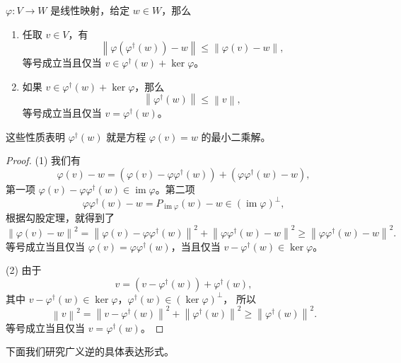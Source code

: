 \documentclass[fontset=none,zihao=-4]{Notes}
\DeclareMathOperator\im{im}
\newcommand{\norm}[1]{\left\lVert#1\right\rVert}
\begin{document}
\begin{theorem}[最小二乘解]
  $\varphi:V\to W$ 是线性映射，给定 $w\in W$，那么
  \begin{enumerate}
    \item 任取 $v\in V$，有
    \[
      \norm{\varphi(\varphi^\dagger(w))-w}\leq\norm{\varphi(v)-w},  
    \]
    等号成立当且仅当 $v\in\varphi^\dagger(w)+\ker\varphi$。
    \item 如果 $v\in\varphi^\dagger(w)+\ker\varphi$，那么
    \[
      \norm{\varphi^\dagger(w)}\leq\norm{v},  
    \]
    等号成立当且仅当 $v=\varphi^\dagger(w)$。
  \end{enumerate}
  这些性质表明 $\varphi^\dagger(w)$ 就是方程 $\varphi(v)=w$ 的最小二乘解。
\end{theorem}
\begin{proof}
  (1) 我们有
  \[
    \varphi(v)-w=(\varphi(v)-\varphi\varphi^\dagger(w))+(\varphi\varphi^\dagger(w)-w),  
  \]
  第一项 $\varphi(v)-\varphi\varphi^\dagger(w)\in\im\varphi$。第二项
  \[
    \varphi\varphi^\dagger(w)-w=P_{\im\varphi}(w)-w\in(\im\varphi)^\bot,  
  \]
  根据勾股定理，就得到了
  \[
    \norm{\varphi(v)-w}^2=\norm{\varphi(v)-\varphi\varphi^\dagger(w)}^2
    +\norm{\varphi\varphi^\dagger(w)-w}^2\geq \norm{\varphi\varphi^\dagger(w)-w}^2.
  \]
  等号成立当且仅当 $\varphi(v)=\varphi\varphi^\dagger(w)$，当且仅当 $v-\varphi^\dagger(w)\in\ker\varphi$。

  (2) 由于
  \[
    v=(v-\varphi^\dagger(w))+\varphi^\dagger(w),  
  \]
  其中 $v-\varphi^\dagger(w)\in\ker\varphi$，$\varphi^\dagger(w)\in(\ker\varphi)^\bot$，
  所以
  \[
    \norm{v}^2=\norm{v-\varphi^\dagger(w)}^2+\norm{\varphi^\dagger(w)}^2\geq\norm{\varphi^\dagger(w)}^2.  
  \]
  等号成立当且仅当 $v=\varphi^\dagger(w)$。
\end{proof}

下面我们研究广义逆的具体表达形式。
\end{document}
